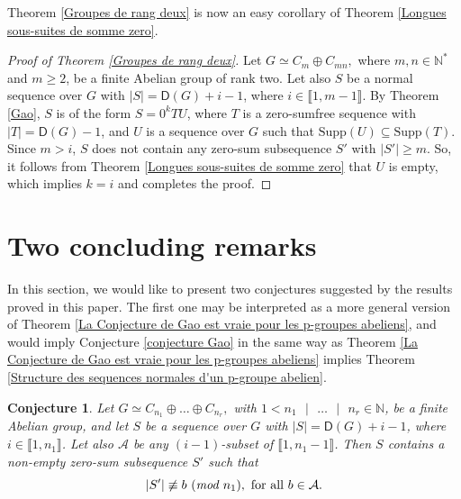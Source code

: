 \documentclass[english,12pt,a4paper,twoside]{smfart}
\theoremstyle{plain}
\newtheorem{conjecture}{Conjecture}
\theoremstyle{definition}
\theoremstyle{remark}
\begin{document}
Theorem \ref{Groupes de rang deux} is now an easy corollary of Theorem \ref{Longues sous-suites de somme zero}.
\begin{proof}[Proof of Theorem \ref{Groupes de rang deux}] Let $G \simeq C_{m} \oplus C_{mn},$ where $m,n \in \mathbb{N}^*$ and $m \geq 2$, be a finite Abelian group of rank two. Let also $S$ be a normal sequence over $G$ with $\left|S\right|=\mathsf{D}(G)+i-1$, where $i \in \llbracket 1,m-1 \rrbracket$. By Theorem \ref{Gao}, $S$ is of the form $S=0^{k}TU$, where $T$ is a zero-sumfree sequence with $\left|T\right|=\mathsf{D}(G)-1$, and $U$ is a sequence over $G$ such that $\text{Supp}(U) \subseteq \text{Supp}(T)$. Since $m >i$, $S$ does not contain any zero-sum subsequence $S'$ with $\left|S'\right| \geq m$. So, it follows from Theorem \ref{Longues sous-suites de somme zero} that $U$ is empty, which implies $k=i$ and completes the proof.
\end{proof}




















\vspace{-0.38cm}
\section{Two concluding remarks}
\label{Conclusion}
In this section, we would like to present two conjectures suggested by the results proved in this paper. The first one may be interpreted as a more general version of Theorem \ref{La Conjecture de Gao est vraie pour les p-groupes abeliens}, and would imply Conjecture \ref{conjecture Gao} in the same way as Theorem \ref{La Conjecture de Gao est vraie pour les p-groupes abeliens} implies Theorem \ref{Structure des sequences normales d'un p-groupe abelien}.

\begin{conjecture}
\label{conjecture generale Girard} 
Let $G \simeq C_{n_1} \oplus \dots \oplus C_{n_r},$ with $1 < n_1 \text{ } |\text{ } \dots \text{ }|\text{ } n_r \in \mathbb{N}$, be a finite Abelian group, and let $S$ be a sequence over $G$ with $\left|S\right|=\mathsf{D}(G)+i-1$, where $i \in \llbracket 1,n_1 \rrbracket$. Let also $\mathcal{A}$ be any $(i-1)$-subset of $\llbracket 1,n_1-1 \rrbracket$. Then $S$ contains a non-empty zero-sum subsequence $S'$ such that
$$\left|S'\right| \not\equiv b \text{ } (\text{\em mod \em} n_1), \text{ for all } b  \in \mathcal{A}.$$
\end{conjecture}
\end{document}
